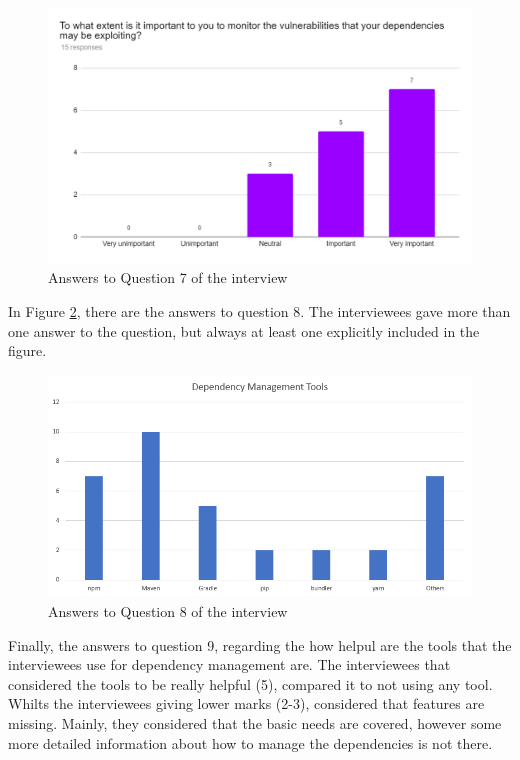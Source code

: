 \begin{figure}[ht!]
\begin{center}
\includegraphics[width=\textwidth]{figures/interview/Question7.png}
\caption{Answers to Question 7 of the interview}
\label{fig:interview-7}
\end{center}
\end{figure}

In Figure \ref{fig:interview-8}, there are the answers to question 8. The interviewees gave more than one answer to the question, but always at least one explicitly included in the figure.

\begin{figure}[ht!]
\begin{center}
\includegraphics[width=\textwidth]{figures/interview/Question8.png}
\caption{Answers to Question 8 of the interview}
\label{fig:interview-8}
\end{center}
\end{figure}

Finally, the answers to question 9, regarding the how helpul are the tools that the interviewees use for dependency management are. The interviewees that considered the tools to be really helpful (5), compared it to not using any tool. Whilts the interviewees giving lower marks (2-3), considered that features are missing. Mainly, they considered that the basic needs are covered, however some more detailed information about how to manage the dependencies is not there.

